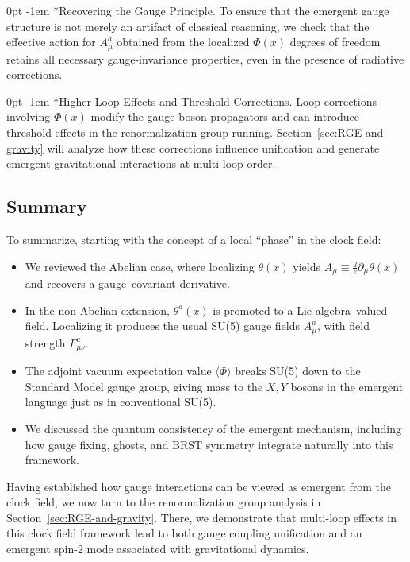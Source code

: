 \documentclass[aps,prd,preprint,groupedaddress]{revtex4-2}
\makeatletter
\renewcommand{\paragraph}[1]{%
  \@startsection{paragraph}{4}{\z@}%
    {0pt}%
    {-1em}%
    {\normalfont\normalsize\itshape}*{#1}}
\makeatother
\begin{document}
\paragraph{Recovering the Gauge Principle.}
To ensure that the emergent gauge structure is not merely an artifact of classical reasoning, we check that the effective action for $A_\mu^a$ obtained from the localized $\Phi(x)$ degrees of freedom retains all necessary gauge-invariance properties, even in the presence of radiative corrections.  

\paragraph{Higher-Loop Effects and Threshold Corrections.}
Loop corrections involving $\Phi(x)$ modify the gauge boson propagators and can introduce threshold effects in the renormalization group running.  
Section~\ref{sec:RGE-and-gravity} will analyze how these corrections influence unification and generate emergent gravitational interactions at multi-loop order.

\subsection{Summary}

To summarize, starting with the concept of a local ``phase'' in the clock field:
\begin{itemize}
    \item We reviewed the Abelian case, where localizing $\theta(x)$ yields $A_\mu \equiv \frac{q}{e}\partial_\mu\theta(x)$ and recovers a gauge–covariant derivative.
    \item In the non-Abelian extension, $\theta^a(x)$ is promoted to a Lie-algebra--valued field. Localizing it produces the usual SU(5) gauge fields $A_\mu^a$, with field strength $F_{\mu\nu}^a$.
    \item The adjoint vacuum expectation value $\langle \Phi\rangle$ breaks SU(5) down to the Standard Model gauge group, giving mass to the $X,Y$ bosons in the emergent language just as in conventional SU(5).
    \item We discussed the quantum consistency of the emergent mechanism, including how gauge fixing, ghosts, and BRST symmetry integrate naturally into this framework.
\end{itemize}
Having established how gauge interactions can be viewed as emergent from the clock field, we now turn to the renormalization group analysis in Section~\ref{sec:RGE-and-gravity}. There, we demonstrate that multi-loop effects in this clock field framework lead to both gauge coupling unification and an emergent spin-2 mode associated with gravitational dynamics.
\end{document}
